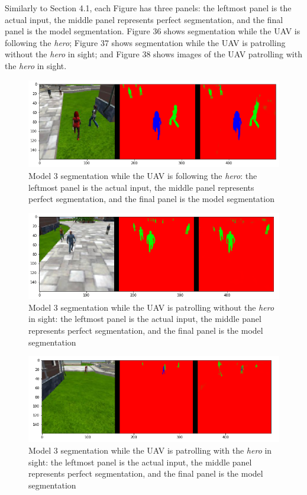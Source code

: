 \documentclass[a4paper]{article}
\begin{document}
Similarly to Section 4.1, each Figure has three panels: the leftmost panel is the actual input, the middle panel represents perfect segmentation, and the final panel is the model segmentation. Figure 36 shows segmentation while the UAV is following the \textit{hero}; Figure 37 shows segmentation while the UAV is patrolling without the \textit{hero} in sight; and Figure 38 shows images of the UAV patrolling with the \textit{hero} in sight.
\begin{figure}[h]
\centering
\includegraphics[scale=0.4]{model_3_1}
\caption{Model 3 segmentation while the UAV is following the \textit{hero}: the leftmost panel is the actual input, the middle panel represents perfect segmentation, and the final panel is the model segmentation}
\end{figure}

\begin{figure}[h]
\centering
\includegraphics[scale=0.4]{model_3_2}
\caption{Model 3 segmentation while the UAV is patrolling without the \textit{hero} in sight: the leftmost panel is the actual input, the middle panel represents perfect segmentation, and the final panel is the model segmentation}
\end{figure}

\begin{figure}[h]
\centering
\includegraphics[scale=0.4]{model_3_3}
\caption{Model 3 segmentation while the UAV is patrolling with the \textit{hero} in sight: the leftmost panel is the actual input, the middle panel represents perfect segmentation, and the final panel is the model segmentation}
\end{figure}
\end{document}
